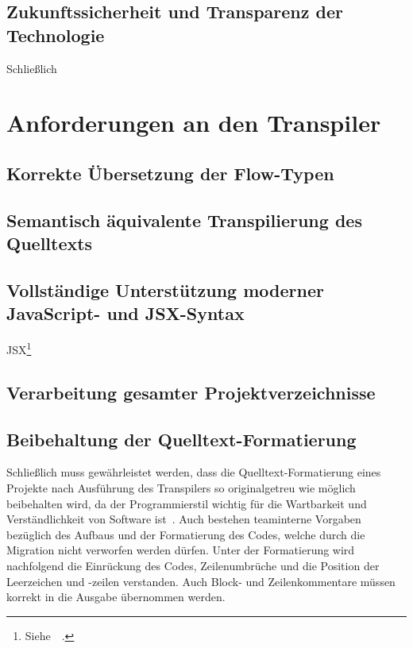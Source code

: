 \subsection{Zukunftssicherheit und Transparenz der Technologie}

Schließlich

\section{Anforderungen an den Transpiler}

\subsection{Korrekte Übersetzung der Flow-Typen}
\label{subsection:requirement:correct-translation}

\subsection{Semantisch äquivalente Transpilierung des Quelltexts}
\label{subsection:requirement:semantic-equivalence}

\subsection{Vollständige Unterstützung moderner JavaScript- und JSX-Syntax}
\label{subsection:requirement:modern-js-support}

JSX\footnote{Siehe~~\autocite{SOFTWARE:JSX}.}

\subsection{Verarbeitung gesamter Projektverzeichnisse}
\label{subsection:requirement:batch-processing}



\subsection{Beibehaltung der Quelltext-Formatierung}
\label{subsection:requirement:format}

Schließlich muss gewährleistet werden, dass die Quelltext-Formatierung eines Projekte nach Ausführung des Transpilers so originalgetreu wie möglich beibehalten wird, da der Programmierstil wichtig für die Wartbarkeit und Verständlichkeit von Software ist~\autocite[146]{KERNIGHAN:1982}. Auch bestehen teaminterne Vorgaben bezüglich des Aufbaus und der Formatierung des Codes, welche durch die Migration nicht verworfen werden dürfen. Unter der Formatierung wird nachfolgend die Einrückung des Codes, Zeilenumbrüche und die Position der Leerzeichen und -zeilen verstanden. Auch Block- und Zeilenkommentare müssen korrekt in die Ausgabe übernommen werden.
